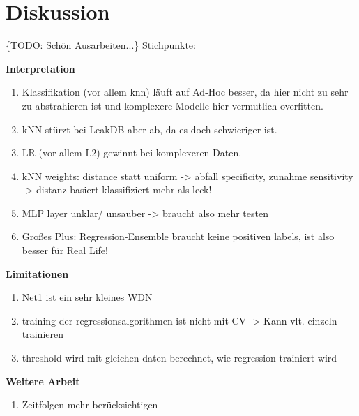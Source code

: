 \chapter{Diskussion}

\{TODO: Schön Ausarbeiten...\}
Stichpunkte:

\textbf{Interpretation}
\begin{enumerate}
    \item Klassifikation (vor allem knn) läuft auf Ad-Hoc besser, da hier nicht zu sehr zu abstrahieren ist und komplexere Modelle hier vermutlich overfitten.
    \item kNN stürzt bei LeakDB aber ab, da es doch schwieriger ist.
    \item LR (vor allem L2) gewinnt bei komplexeren Daten.
    \item kNN weights: distance statt uniform -> abfall specificity, zunahme sensitivity -> distanz-basiert klassifiziert mehr als leck!
    \item MLP layer unklar/ unsauber -> braucht also mehr testen
    \item Großes Plus: Regression-Ensemble braucht keine positiven labels, ist also besser für Real Life!
\end{enumerate}

\textbf{Limitationen}
\begin{enumerate}
    \item Net1 ist ein sehr kleines WDN
    \item training der regressionsalgorithmen ist nicht mit CV -> Kann vlt. einzeln trainieren
    \item threshold wird mit gleichen daten berechnet, wie regression trainiert wird
\end{enumerate}

\textbf{Weitere Arbeit}
\begin{enumerate}
    \item Zeitfolgen mehr berücksichtigen
\end{enumerate}

